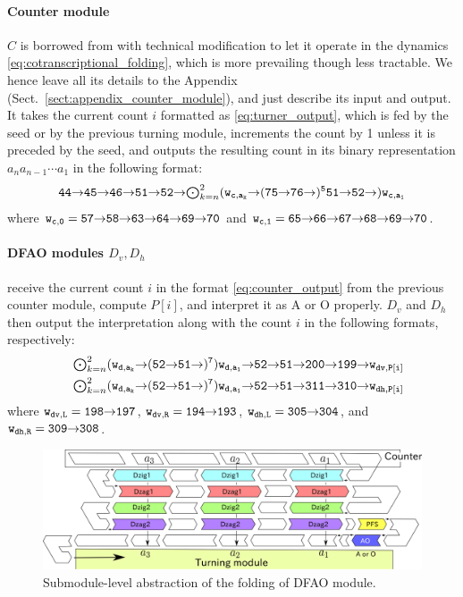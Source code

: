 \documentclass[runningheads]{llncs}
\newcommand{\east}{{\ensuremath \to}}
\begin{document}
\paragraph{Counter module} $C$ is borrowed from \cite{GeMeScSe2016} with technical modification to let it operate in the dynamics \eqref{eq:cotranscriptional_folding}, which is more prevailing \cite{HanKim2017,HaKiOtSe2016,OtaSeki2017} though less tractable. 
We hence leave all its details to the Appendix (Sect.~\ref{sect:appendix_counter_module}), and just describe its input and output. 
It takes the current count $i$ formatted as \eqref{eq:turner_output}, which is fed by the seed or by the previous turning module, increments the count by 1 unless it is preceded by the seed, and outputs the resulting count in its binary representation $a_n a_{n-1} \cdots a_1$ in the following format:
\begin{equation}\label{eq:counter_output}{\tt 
	44 \east 45 \east 46 \east 51 \east 52 \east \mbox{$\bigodot_{k = n}^2$} (w_{c, a_k} \east (75 \east 76 \east)^5 51 \east 52 \east) w_{c, a_1}
}\end{equation}
where ${\tt w_{c, 0} = 57 \east 58 \east 63 \east 64 \east 69 \east 70}$ and ${\tt w_{c, 1} = 65 \east 66 \east 67 \east 68 \east 69 \east 70}$. 

\paragraph{DFAO modules $D_v, D_h$} receive the current count $i$ in the format \eqref{eq:counter_output} from the previous counter module, compute $P[i]$, and interpret it as A or O properly. 
$D_v$ and $D_h$ then output the interpretation along with the count $i$ in the following formats, respectively: 
\begin{eqnarray}
& & {\tt \mbox{$\bigodot_{k=n}^2$} (w_{d, a_k} \east (52 \east 51 \east)^7) w_{d, a_1} \east 52 \east 51 \east 200 \east 199 \east w_{dv, P[i]}} \label{eq:Dv_output}\\
& & {\tt \mbox{$\bigodot_{k=n}^2$} (w_{d, a_k} \east (52 \east 51 \east)^7) w_{d, a_1} \east 52 \east 51 \east 311 \east 310 \east w_{dh, P[i]}} \label{eq:Dh_output}
\end{eqnarray}
where ${\tt w_{dv, L} = 198 \east 197}$, ${\tt w_{dv, R} = 194 \east 193}$, ${\tt w_{dh, L} = 305 \east 304}$, and ${\tt w_{dh, R} = 309 \east 308}$.

\begin{figure}[tb]
\includegraphics[width=\linewidth]{pics/abst_DFAO.png}
\caption{Submodule-level abstraction of the folding of DFAO module.}
\label{fig:abst_dfao}
\end{figure}
\end{document}
